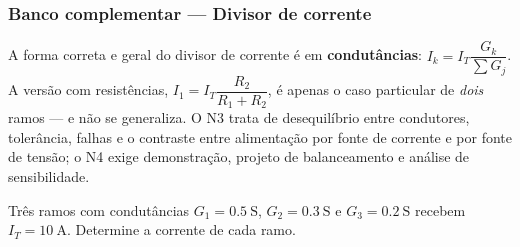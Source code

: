 
\subsubsection*{Banco complementar --- Divisor de corrente}

\begin{atencao}
A forma correta e geral do divisor de corrente é em \textbf{condutâncias}:
$I_k=I_T\dfrac{G_k}{\sum G_j}$. A versão com resistências,
$I_1=I_T\dfrac{R_2}{R_1+R_2}$, é apenas o caso particular de \emph{dois} ramos
--- e não se generaliza. O N3 trata de desequilíbrio entre condutores,
tolerância, falhas e o contraste entre alimentação por fonte de corrente e por
fonte de tensão; o N4 exige demonstração, projeto de balanceamento e análise de
sensibilidade.
\end{atencao}

\blocofixacao

\begin{questao}[1]{}
Três ramos com condutâncias $G_1=\SI{0.5}{\ensuremath{\mathrm{S}}}$,
$G_2=\SI{0.3}{\ensuremath{\mathrm{S}}}$ e $G_3=\SI{0.2}{\ensuremath{\mathrm{S}}}$ recebem
$I_T=\SI{10}{\ampere}$. Determine a corrente de cada ramo.
\end{questao}

